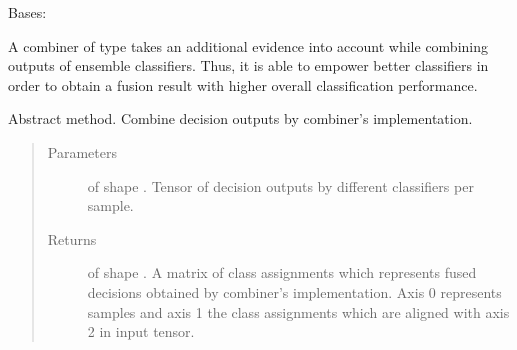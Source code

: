 \documentclass[letterpaper,10pt,english]{sphinxmanual}
\begin{document}
\begin{fulllineitems}
\label{\detokenize{pusion.core.combiner:pusion.core.combiner.EvidenceBasedCombiner}}
\sphinxAtStartPar
Bases: {\hyperref[\detokenize{pusion.core.combiner:pusion.core.combiner.Combiner}]{}}

\sphinxAtStartPar
A combiner of type {\hyperref[\detokenize{pusion.core.combiner:pusion.core.combiner.EvidenceBasedCombiner}]{}} takes an additional evidence into account while combining outputs
of ensemble classifiers. Thus, it is able to empower better classifiers in order to obtain a fusion result with
higher overall classification performance.

\begin{fulllineitems}
\label{\detokenize{pusion.core.combiner:pusion.core.combiner.EvidenceBasedCombiner.combine}}
\sphinxAtStartPar
Abstract method. Combine decision outputs by combiner’s implementation.
\begin{quote}\begin{description}
\item[{Parameters}] \leavevmode
\sphinxAtStartPar
{} \textendash{}  of shape .
Tensor of decision outputs by different classifiers per sample.

\item[{Returns}] \leavevmode
\sphinxAtStartPar
{} of shape . A matrix of class assignments which represents fused
decisions obtained by combiner’s implementation. Axis 0 represents samples and axis 1 the class
assignments which are aligned with axis 2 in  input tensor.

\end{description}\end{quote}


\end{fulllineitems}
\end{fulllineitems}
\end{document}
